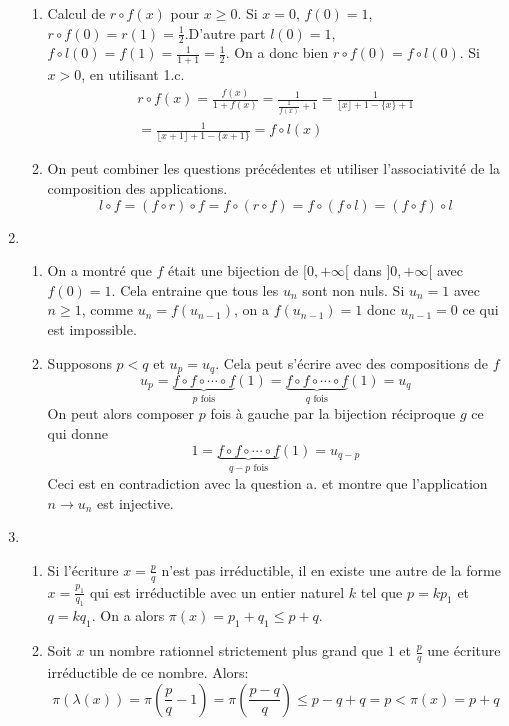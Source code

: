 \begin{enumerate}
\begin{enumerate}
 \item Calcul de $r\circ f(x)$ pour $x\geq 0$.\newline
Si $x=0$, $f(0)=1$, $r\circ f(0)=r(1)=\frac{1}{2}$.D'autre part $l(0)=1$, $f\circ l(0)=f(1)=\frac{1}{1+1}=\frac{1}{2}$. On a donc bien $r\circ f(0)=f\circ l(0)$.\newline
Si $x>0$, en utilisant 1.c.
\begin{multline*}
 r\circ f(x) = \frac{f(x)}{1+f(x)}=\frac{1}{\frac{1}{f(x)}+1}
=\frac{1}{\lfloor x\rfloor +1 -\{x\}+1} \\
=\frac{1}{\lfloor x+1\rfloor +1-\{x+1\}}=f\circ l(x)
\end{multline*}

 \item On peut combiner les questions précédentes et utiliser l'associativité de la composition des applications.
\begin{displaymath}
 l\circ f = (f\circ r)\circ f=f\circ (r\circ f)=f\circ(f\circ l)=(f\circ f)\circ l
\end{displaymath}
 
\end{enumerate}
 
 \item
\begin{enumerate}
 \item On a montré que $f$ était une bijection de $[0,+\infty[$ dans $]0,+\infty[$ avec $f(0)=1$. Cela entraine que tous les $u_n$ sont non nuls. Si $u_n=1$ avec $n\geq 1$, comme $u_n=f(u_{n-1})$, on a $f(u_{n-1})=1$ donc $u_{n-1}=0$ ce qui est impossible.
 \item  Supposons $p<q$ et $u_p=u_q$. Cela peut s'écrire avec des compositions de $f$
\begin{displaymath}
 u_p = \underset{p\text{ fois}}{\underbrace{f\circ f\circ \cdots \circ f}}(1)
=
\underset{q\text{ fois}}{\underbrace{f\circ f\circ \cdots \circ f}}(1)=u_q
\end{displaymath}
On peut alors composer $p$ fois à gauche par la bijection réciproque $g$ ce qui donne
\begin{displaymath}
 1 = \underset{q-p\text{ fois}}{\underbrace{f\circ f\circ \cdots \circ f}}(1)=u_{q-p}
\end{displaymath}
Ceci est en contradiction avec la question a. et montre que l'application $n\rightarrow u_n$ est injective.
\end{enumerate}

 \item 
\begin{enumerate}
 \item Si l'écriture $x=\frac{p}{q}$ n'est pas irréductible, il en existe une autre de la forme $x=\frac{p_1}{q_1}$ qui est irréductible avec un entier naturel $k$ tel que $p=kp_1$ et $q=kq_1$. On a alors $\pi(x)=p_1+q_1\leq p+q$. 
 \item Soit $x$ un nombre rationnel strictement plus grand que $1$ et $\frac{p}{q}$ une écriture irréductible de ce nombre. Alors:
\begin{displaymath}
 \pi(\lambda(x))=\pi(\frac{p}{q}-1)=\pi(\frac{p-q}{q})\leq p-q +q=p < \pi(x)=p+q
\end{displaymath}


\end{enumerate}
\end{enumerate}
